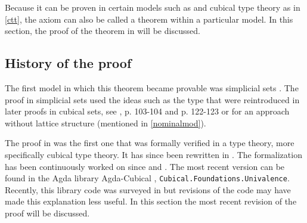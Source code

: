 \documentclass[12pt,a4paper,twoside,xetex]{book}
\newcommand{\type}{\mathcal{U}}
\begin{document}
Because it can be proven in certain models such as \cite{Kapulkin2012} and cubical type theory as in \cref{ctt}, the axiom can also be called a theorem within a particular model. In this section, the proof of the theorem in \cite{Moertberg2018} will be discussed.

\subsection{History of the proof}

The first model in which this theorem became provable was simplicial sets \cite{Kapulkin2012}. The proof in simplicial sets used the ideas such as the  type that were reintroduced in later proofs in cubical sets, see \cite{Huber2016}, p. 103-104 and p. 122-123 or \cite{Bezem2018} for an approach without lattice structure (mentioned in \cref{nominalmod}). 

The proof in \cite{Huber2016} was the first one that was formally verified in a type theory, more specifically cubical type theory. It has since been rewritten in \cite{Weinberger2016}. The formalization has been continuously worked on since \cite{Moertberg2015} and \cite{Cohen2016}. The most recent version can be found in the Agda library Agda-Cubical  \cite{Moertberg2018}, \texttt{Cubical.Foundations.Univalence}. Recently, this library code was surveyed in \cite{Moertberg2018a} but revisions of the code may have made this explanation less useful. In this section the most recent revision of the proof will be discussed.


% 
\end{document}
